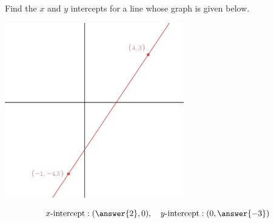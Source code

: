 \documentclass{ximera}
\begin{document}
\begin{problem}\label{prob:160hom4prob5}
Find the $x$ and $y$ intercepts for a line whose graph is given below.

 
 \begin{image}
   \includegraphics[height=3in]{160H4pic4.jpg}
 \end{image}
 
 $$x\mbox{-intercept}: (\answer{2},0),\quad y\mbox{-intercept}: (0, \answer{-3})$$
\end{problem}
\end{document}
